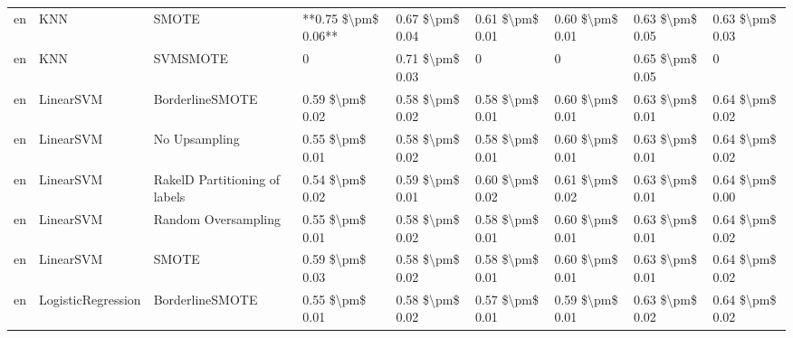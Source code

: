 \begin{tabular}{lllllllll}
      en &                             KNN &                         SMOTE & **0.75 \$\textbackslash pm\$ 0.06** &           0.67 \$\textbackslash pm\$ 0.04 &       0.61 \$\textbackslash pm\$ 0.01 &        0.60 \$\textbackslash pm\$ 0.01 &                         0.63 \$\textbackslash pm\$ 0.05 &     0.63 \$\textbackslash pm\$ 0.03 \\
      en &                             KNN &                      SVMSMOTE &                   0 &           0.71 \$\textbackslash pm\$ 0.03 &                     0 &                      0 &                         0.65 \$\textbackslash pm\$ 0.05 &                   0 \\
      en &                       LinearSVM &               BorderlineSMOTE &     0.59 \$\textbackslash pm\$ 0.02 &           0.58 \$\textbackslash pm\$ 0.02 &       0.58 \$\textbackslash pm\$ 0.01 &        0.60 \$\textbackslash pm\$ 0.01 &                         0.63 \$\textbackslash pm\$ 0.01 &     0.64 \$\textbackslash pm\$ 0.02 \\
      en &                       LinearSVM &                 No Upsampling &     0.55 \$\textbackslash pm\$ 0.01 &           0.58 \$\textbackslash pm\$ 0.02 &       0.58 \$\textbackslash pm\$ 0.01 &        0.60 \$\textbackslash pm\$ 0.01 &                         0.63 \$\textbackslash pm\$ 0.01 &     0.64 \$\textbackslash pm\$ 0.02 \\
      en &                       LinearSVM & RakelD Partitioning of labels &     0.54 \$\textbackslash pm\$ 0.02 &           0.59 \$\textbackslash pm\$ 0.01 &       0.60 \$\textbackslash pm\$ 0.02 &        0.61 \$\textbackslash pm\$ 0.02 &                         0.63 \$\textbackslash pm\$ 0.01 &     0.64 \$\textbackslash pm\$ 0.00 \\
      en &                       LinearSVM &           Random Oversampling &     0.55 \$\textbackslash pm\$ 0.01 &           0.58 \$\textbackslash pm\$ 0.02 &       0.58 \$\textbackslash pm\$ 0.01 &        0.60 \$\textbackslash pm\$ 0.01 &                         0.63 \$\textbackslash pm\$ 0.01 &     0.64 \$\textbackslash pm\$ 0.02 \\
      en &                       LinearSVM &                         SMOTE &     0.59 \$\textbackslash pm\$ 0.03 &           0.58 \$\textbackslash pm\$ 0.02 &       0.58 \$\textbackslash pm\$ 0.01 &        0.60 \$\textbackslash pm\$ 0.01 &                         0.63 \$\textbackslash pm\$ 0.01 &     0.64 \$\textbackslash pm\$ 0.02 \\
      en &              LogisticRegression &               BorderlineSMOTE &     0.55 \$\textbackslash pm\$ 0.01 &           0.58 \$\textbackslash pm\$ 0.02 &       0.57 \$\textbackslash pm\$ 0.01 &        0.59 \$\textbackslash pm\$ 0.01 &                         0.63 \$\textbackslash pm\$ 0.02 &     0.64 \$\textbackslash pm\$ 0.02 \\

\end{tabular}
